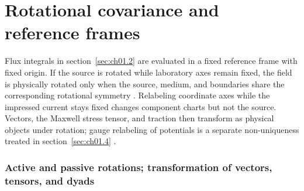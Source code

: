 \section{Rotational covariance and reference frames}
\label{sec:ch01.3}

Flux integrals in section~\ref{sec:ch01.2} are evaluated in a fixed reference frame with fixed origin. If the source is rotated while laboratory axes remain fixed, the field is physically rotated only when the source, medium, and boundaries share the corresponding rotational symmetry \cite{stratton1941,hansen1988}. Relabeling coordinate axes while the impressed current stays fixed changes component charts but not the source. Vectors, the Maxwell stress tensor, and traction then transform as physical objects under rotation; gauge relabeling of potentials is a separate non-uniqueness treated in section~\ref{sec:ch01.4} \cite{belinfante1940,maxwell1873}.

\label{sec:ch01.3.1}

\subsubsection*{Active and passive rotations; transformation of vectors, tensors, and dyads}

